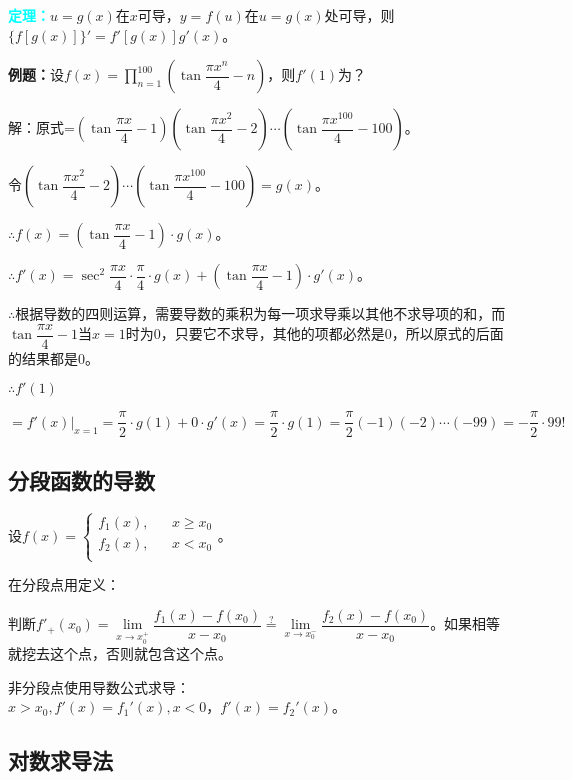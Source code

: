 \documentclass[UTF8, 12pt]{ctexart}
\begin{document}
        \textcolor{aqua}{\textbf{定理：}}$u=g(x)$在$x$可导，$y=f(u)$在$u=g(x)$处可导，则$\{f[g(x)]\}'=f'[g(x)]g'(x)$。

        \textbf{例题：}设$f(x)=\prod\limits_{n=1}^{100}\left(\tan\dfrac{\pi x^n}{4}-n\right)$，则$f'(1)$为？

        解：原式=$\left(\tan\dfrac{\pi x}{4}-1\right)\left(\tan\dfrac{\pi x^2}{4}-2\right)\cdots\left(\tan\dfrac{\pi x^{100}}{4}-100\right)$。

        令$\left(\tan\dfrac{\pi x^2}{4}-2\right)\cdots\left(\tan\dfrac{\pi x^{100}}{4}-100\right)=g(x)$。\medskip

        $\therefore f(x)=\left(\tan\dfrac{\pi x}{4}-1\right)\cdot g(x)$。\medskip

        $\therefore f'(x)=\sec^2\dfrac{\pi x}{4}\cdot\dfrac{\pi}{4}\cdot g(x)+\left(\tan\dfrac{\pi x}{4}-1\right)\cdot g'(x)$。\medskip

        $\therefore$根据导数的四则运算，需要导数的乘积为每一项求导乘以其他不求导项的和，而$\tan\dfrac{\pi x}{4}-1$当$x=1$时为0，只要它不求导，其他的项都必然是0，所以原式的后面的结果都是0。

        $\therefore f'(1)$

        $=f'(x)\vert_{x=1}=\dfrac{\pi}{2}\cdot g(1)+0\cdot g'(x)=\dfrac{\pi}{2}\cdot g(1)=\dfrac{\pi}{2}(-1)(-2)\cdots(-99)=-\dfrac{\pi}{2}\cdot 99!$

        \subsection{分段函数的导数}

        设$f(x)=\left\{
        \begin{array}{lcl}
            f_1(x), & & x\geqslant x_0 \\
            f_2(x), & & x<x_0 \\
        \end{array}
        \right.$。\medskip

        在分段点用定义：

        判断$f'_+(x_0)=\lim\limits_{x\to x_0^+}\dfrac{f_1(x)-f(x_0)}{x-x_0}\overset{?}{=}\lim\limits_{x\to x_0^-}\dfrac{f_2(x)-f(x_0)}{x-x_0}$。如果相等就挖去这个点，否则就包含这个点。

        非分段点使用导数公式求导：$x>x_0,f'(x)=f_1'(x),x<0，f'(x)=f_2'(x)$。

        \subsection{对数求导法}
\end{document}
